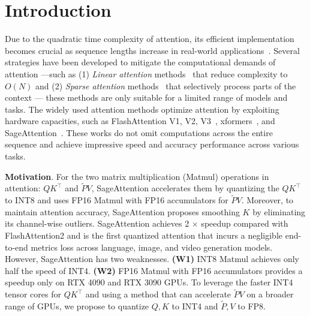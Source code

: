 \section{Introduction}
Due to the quadratic time complexity of attention, its efficient implementation becomes crucial as sequence lengths increase in real-world applications~\cite{jiang2024minference,zhang2025sage}. Several strategies have been developed to mitigate the computational demands of attention —such as (1) \textit{Linear attention} methods~\cite{wang2020linformer,choromanski2020rethinking,yu2022metaformer,katharopoulos2020transformers} that reduce complexity to $O(N)$ and (2) \textit{Sparse attention} methods~\cite{liu2021swin,chu2021twins,liuniformer,xiao2023efficient,xiao2024infllm,chen2023longlora,jiang2024minference,venkataramanan2023skip,gao2024seerattention,moaattention,zhang2025spargeattn,xi2025sparse,yang2025sparse,zhang2025spargeattn_wksp,zhang2025fast,zhang2025faster} that selectively process parts of the context — these methods are only suitable for a limited range of models and tasks. The widely used attention methods optimize attention by exploiting hardware capacities, such as FlashAttention V1, V2, V3~\cite{dao2022flashattention,dao2023flashattention,shah2024flashattention}, xformers~\cite{xFormers2022}, and SageAttention~\cite{2024sageattention,zhang2025sageattention3,zhang2025sageattention2++,zhang2025sageattention2_wksp}. These works do not omit computations across the entire sequence and achieve impressive speed and accuracy performance across various tasks.

\noindent\textbf{{Motivation}}. For the two matrix multiplication (Matmul) operations in attention: $QK^\top$ and $\widetilde{P}V$, SageAttention accelerates them by quantizing the $QK^\top$ to INT8 and uses FP16 Matmul with FP16 accumulators for $\widetilde{P}V$. Moreover, to maintain attention accuracy, SageAttention proposes smoothing $K$ by eliminating its channel-wise outliers. SageAttention achieves 2 $\times$ speedup compared with FlashAttention2 and is the first quantized attention that incurs a negligible end-to-end metrics loss across language, image, and video generation models. However, SageAttention has two weaknesses. \textbf{(W1)} INT8 Matmul achieves only half the speed of INT4. \textbf{(W2)} FP16 Matmul with FP16 accumulators provides a speedup only on RTX 4090 and RTX 3090 GPUs.
To leverage the faster INT4 tensor cores for $QK^\top$ and using a method that can accelerate $\widetilde{P}V$ on a broader range of GPUs, we propose to quantize $Q, K$ to INT4 and $\widetilde{P}, V$ to FP8.

